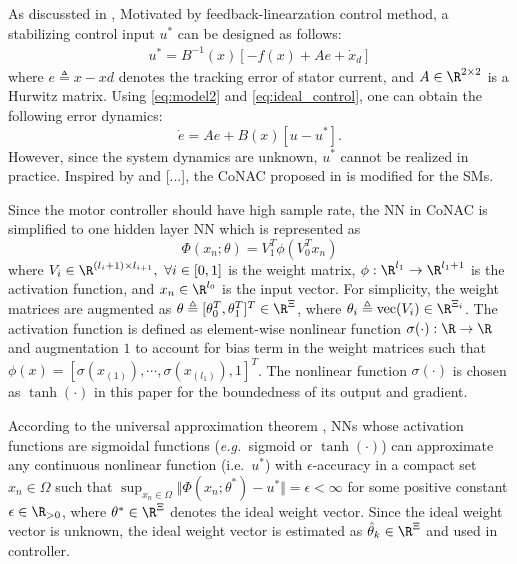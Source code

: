 \documentclass[conference]{IEEEtran}
\newcommand\eg{\textit{e.g.\ }}
\newcommand\ie{\textrm{i.e.\ }}
\begin{document}
As discussted in \cite{Xu:2003aa}, 
Motivated by feedback-linearzation control method, a stabilizing control input $u^*$ can be designed as follows:
\begin{eqnarray}
	u^* = B^{-1}(x) [ -f(x) +Ae + \dot x_d]
	\label{eq:ideal_control}
\end{eqnarray}
where $e\triangleq x-xd$ denotes the tracking error of stator current, and $A\in\R^{2\times 2}$ is a Hurwitz matrix. 
Using \eqref{eq:model2} and \eqref{eq:ideal_control}, one can obtain the following error dynamics:
\begin{equation}
	\dot e = Ae + B(x) 
	[
		u-u^*
	]
	.
	\label{eq:error_dynamics1}
\end{equation} 
However, since the system dynamics are unknown, $u^*$ cannot be realized in practice.
Inspired by \cite{Hart:2023aa} and [...], the CoNAC proposed in \cite{Ryu:2024aa} is modified for the SMs.

Since the motor controller should have high sample rate, the NN in CoNAC is simplified to one hidden layer NN which is represented as
\begin{equation}
	\Phi(x_n;\theta) = V_1^T\phi(V_0^Tx_n)
	\label{eq:NN}
\end{equation}
where $V_i\in\R^{(l_i+1)\times l_{i+1}},\ \forall i\in[0,1]$ is the weight matrix, $\phi:\R^{l_{1}} \to \R^{l_{1}+1}$ is the activation function, and $x_n\in\R^{l_0}$ is the input vector.
For simplicity, the weight matrices are augmented as $\theta\triangleq[\theta_0^T, \theta_1^T]^T\in\R^{\Xi}$, where $\theta_i\triangleq \text{vec}(V_i)\in\R^{\Xi_i}$.
The activation function is defined as element-wise nonlinear function $\sigma(\cdot):\R\to\R$ and augmentation $1$ to account for bias term in the weight matrices such that $\phi(x) = [\sigma(x_{(1)}),\cdots,\sigma(x_{(l_1)}),1]^T$.
The nonlinear function $\sigma(\cdot)$ is chosen as $\tanh(\cdot)$ in this paper for the boundedness of its output and gradient.

According to the universal approximation theorem \cite{Cybenko:1989aa,Barron:1993aa}, NNs whose activation functions are sigmoidal functions (\eg sigmoid or $\tanh(\cdot)$) can approximate any continuous nonlinear function (\ie $u^*$) with $\epsilon$-accuracy in a compact set $x_n\in\Omega$ such that $\sup_{x_n\in\Omega} \Vert \Phi(x_n;\theta^*) - u^*\Vert = \epsilon<\infty$ for some positive constant $\epsilon\in\R_{>0}$, where $\theta^*\in\R^\Xi$ denotes the ideal weight vector.
Since the ideal weight vector is unknown, the ideal weight vector is estimated as $\hat\theta_k\in\R^\Xi$ and used in controller.
\end{document}
